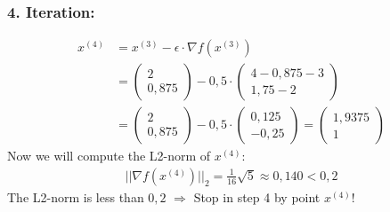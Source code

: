 \documentclass[a4paper]{article}
\begin{document}
        \subsubsection*{4. Iteration:}
            \begin{align*}
                x^{(4)} &= x^{(3)} - \epsilon \cdot \nabla f(x^{(3)})\\
                &= \left( \begin{matrix} 2 \\ 0,875 \end{matrix} \right) - 0,5 \cdot \left( \begin{matrix} 4-0,875-3 \\ 1,75-2 \end{matrix} \right)\\
                &= \left( \begin{matrix} 2 \\ 0,875 \end{matrix} \right) - 0,5 \cdot \left( \begin{matrix} 0,125 \\ -0,25 \end{matrix} \right)
                = \left( \begin{matrix} 1,9375 \\ 1 \end{matrix} \right)
            \end{align*}
            Now we will compute the L2-norm of $x^{(4)}$:
            \begin{align*}
                ||\nabla f(x^{(4)})||_2 = \frac{1}{16} \sqrt{5} \approx 0,140 < 0,2
            \end{align*}
            The L2-norm is less than $0,2$ $\Rightarrow$ Stop in step 4 by point $x^{(4)}$!
            
        
\end{document}

